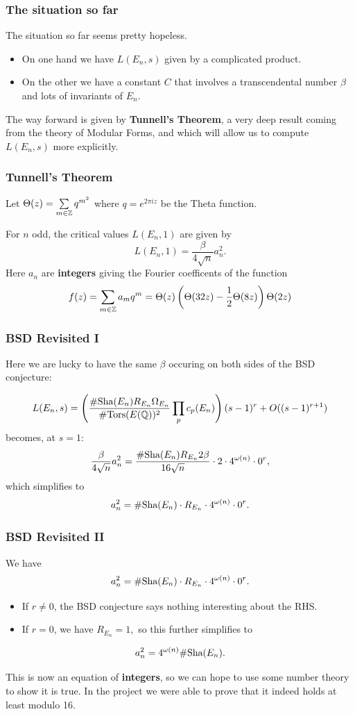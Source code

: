 \documentclass{beamer}
\begin{document}
\begin{frame}
  \frametitle{The situation so far}
  The situation so far seems pretty hopeless.
  \begin{itemize}
  \item On one hand we have $L(E_n,s)$ given by a complicated product.
  \item On the other we have a constant $C$ that involves a transcendental
    number $\beta$ and lots of invariants of $E_n$.
  \end{itemize} \pause
  \bigskip
  
  The way forward is given by \textbf{Tunnell's Theorem}, a very deep result
  coming from the theory of Modular Forms, and which will allow us to compute
  $L(E_n,s)$ more explicitly.
\end{frame}

\begin{frame}
  \frametitle{Tunnell's Theorem}
  Let $\Theta(z) = \sum\limits_{m \in {\mathbb Z}} q^{m^2}$ where $q = e^{2 \pi i z}$ be
  the Theta function. \pause
  \begin{theorem}
    For $n$ odd, the critical values $L(E_n,1)$ are given by
    \[L(E_n,1) = \frac{\beta}{4\sqrt{n}} a_n^2.\]
    Here $a_n$ are \textbf{integers} giving the Fourier coefficents of the function
    \[f(z) = \sum\limits_{m \in {\mathbb Z}} a_m q^m = \Theta(z) \left( \Theta(32z)
      - \frac{1}{2}\Theta(8z)\right) \Theta(2z)\]
  \end{theorem}
\end{frame}

\begin{frame}
  \frametitle{BSD Revisited I}
  Here we are lucky to have the same $\beta$ occuring on both sides of the BSD
  conjecture: 

  \[L(E_n,s) = \left( \frac{\# \text{\normalfont Sha}(E_n) R_{E_n} \Omega_{E_n}}{\#{\text{\normalfont Tors}}(E({\mathbb Q}))^2}
    \prod\limits_p c_p(E_n) \right) (s-1)^r + O((s-1)^{r+1})\] 
  becomes, at $s = 1$: \pause
  \[\frac{\beta}{4 \sqrt{n}} a_n^2 = \frac{\# \text{\normalfont Sha}(E_n) R_{E_n} 2 \beta}{
      16 \sqrt{n}} \cdot 2 \cdot 4^{\omega(n)} \cdot 0^r,\] \pause
  which simplifies to
  \[a_n^2 = \# \text{\normalfont Sha}(E_n) \cdot R_{E_n} \cdot 4^{\omega(n)} \cdot 0^r.\]

\end{frame}

\begin{frame}
  \frametitle{BSD Revisited II}
  We have
  \[a_n^2 = \# \text{\normalfont Sha}(E_n) \cdot R_{E_n} \cdot 4^{\omega(n)} \cdot 0^r.\]
  \begin{itemize}
  \item If $r \neq 0$, the BSD conjecture says nothing interesting about the
    RHS. \pause
  \item If $r = 0$, we have $R_{E_n} = 1,$ so this further simplifies to
  \end{itemize}
  
  \[a_n^2 = 4^{\omega(n)} \# \text{\normalfont Sha}(E_n).\] \pause

  This is now an equation of \textbf{integers}, so we can hope to use some
  number theory to show it is true. In the project we were able to prove that it
  indeed holds at least modulo 16.
\end{frame}
\end{document}
